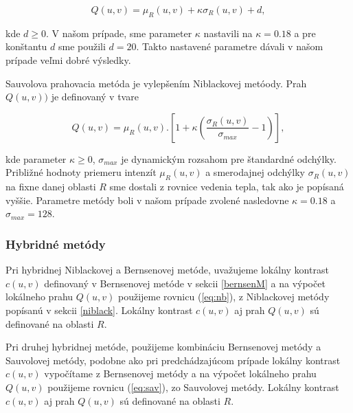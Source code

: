 \documentclass[a4paper,11pt,oneside]{article}%
\begin{document}
\begin{equation} \label{eq:nb}
Q(u,v) = \mu_R(u,v) + \kappa\sigma_R(u,v) + d,
\end{equation}

kde $d \geq 0$. V našom prípade, sme parameter $\kappa$ nastavili na $\kappa = 0.18$ a pre konštantu $d$ sme použili $d = 20$. Takto nastavené parametre dávali v našom prípade veľmi dobré výsledky.


Sauvolova prahovacia metóda je vylepšením Niblackovej metóody. Prah $Q(u,v))$ je definovaný v tvare

\begin{equation}  \label{eq:sav}
Q(u,v) = \mu_R(u,v) . [1 + \kappa(\frac{\sigma_R(u,v)}{\sigma_{max}} - 1)],
\end{equation}

kde parameter $\kappa \geq 0$, $\sigma_{max}$ je dynamickým rozsahom pre štandardné odchýlky. Približné hodnoty priemeru intenzít $\mu_R(u,v)$ a smerodajnej odchýlky  $\sigma_R(u,v)$ na fixne danej oblasti $R$ sme dostali z rovnice vedenia tepla, tak ako je popísaná vyššie. 
Parametre metódy boli v našom prípade zvolené nasledovne $\kappa = 0.18$ a  $\sigma_{max} = 128$. 


\subsubsection{Hybridné metódy}

Pri hybridnej Niblackovej a Bernsenovej metóde, uvažujeme lokálny kontrast $c(u, v)$ definovaný v Bernsenovej metóde v sekcii \ref{bernsenM} a na výpočet lokálneho prahu $Q(u, v)$ použijeme rovnicu (\ref{eq:nb}), z Niblackovej metódy popísanú v sekcii \ref{niblack}. Lokálny kontrast $c(u, v)$ aj prah $Q(u, v)$ sú definované na oblasti $R$.

Pri druhej hybridnej metóde, použijeme kombináciu Bernsenovej metódy a Sauvolovej metódy, podobne ako pri predchádzajúcom prípade lokálny kontrast $c(u, v)$ vypočítame z Bernsenovej metódy a na výpočet lokálneho prahu $Q(u, v)$ použijeme rovnicu (\ref{eq:sav}), zo Sauvolovej metódy. Lokálny kontrast $c(u, v)$ aj prah $Q(u, v)$ sú definované na oblasti $R$.
\end{document}
